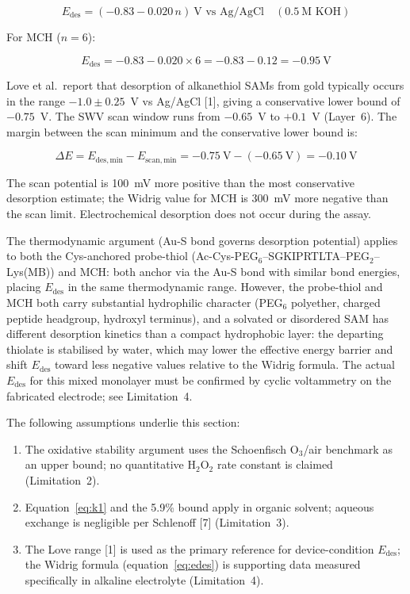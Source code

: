 \documentclass[10pt,a4paper]{article}
\numberwithin{equation}{section}
\newcommand{\cit}[1]{[#1]}   %
\begin{document}
\begin{equation}
  E_{\mathrm{des}} = (-0.83 - 0.020\,n)\ \text{V vs Ag/AgCl}
    \quad (0.5\ \text{M KOH})
  \label{eq:edes}
\end{equation}

For MCH ($n = 6$):

\begin{equation}
  E_{\mathrm{des}} = -0.83 - 0.020 \times 6 = -0.83 - 0.12 = -0.95\ \text{V}
  \label{eq:edes_mch}
\end{equation}

Love et al.\ report that desorption of alkanethiol SAMs from gold typically occurs in the
range $-1.0 \pm 0.25$~V vs Ag/AgCl \cit{1}, giving a conservative lower bound of
$-0.75$~V. The SWV scan window runs from $-0.65$~V to $+0.1$~V (Layer~6). The margin
between the scan minimum and the conservative lower bound is:

\begin{equation}
  \Delta E = E_{\mathrm{des,min}} - E_{\mathrm{scan,min}}
           = -0.75\ \text{V} - (-0.65\ \text{V})
           = -0.10\ \text{V}
  \label{eq:margin}
\end{equation}

The scan potential is 100~mV more positive than the most conservative desorption
estimate; the Widrig value for MCH is 300~mV more negative than the scan limit.
Electrochemical desorption does not occur during the assay.

The thermodynamic argument (Au-S bond governs desorption potential) applies to both
the Cys-anchored probe-thiol (Ac-Cys-PEG$_6$--SGKIPRTLTA--PEG$_2$--Lys(MB)) and
MCH: both anchor via the Au-S bond with similar bond energies, placing $E_{\text{des}}$
in the same thermodynamic range. However, the probe-thiol and MCH both carry substantial
hydrophilic character (PEG$_6$ polyether, charged peptide headgroup, hydroxyl terminus),
and a solvated or disordered SAM has different desorption kinetics than a compact
hydrophobic layer: the departing thiolate is stabilised by water, which may lower the
effective energy barrier and shift $E_{\text{des}}$ toward less negative values relative
to the Widrig formula. The actual $E_{\text{des}}$ for this mixed monolayer must be
confirmed by cyclic voltammetry on the fabricated electrode; see Limitation~4.

The following assumptions underlie this section:

\begin{enumerate}[noitemsep]
  \item The oxidative stability argument uses the Schoenfisch O$_3$/air benchmark as an
    upper bound; no quantitative H$_2$O$_2$ rate constant is claimed (Limitation~2).
  \item Equation~\eqref{eq:k1} and the 5.9\% bound apply in organic solvent; aqueous
    exchange is negligible per Schlenoff \cit{7} (Limitation~3).
  \item The Love range \cit{1} is used as the primary reference for device-condition
    $E_{\mathrm{des}}$; the Widrig formula (equation~\ref{eq:edes}) is supporting data
    measured specifically in alkaline electrolyte (Limitation~4).
\end{enumerate}
\end{document}
